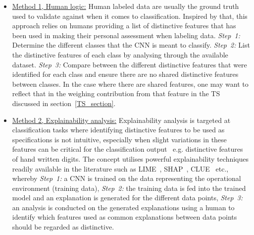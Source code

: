\begin{itemize}
    \item 
    \underline{Method 1, Human logic:} 
    Human labeled data are usually the ground truth used to validate against when it comes to classification. Inspired by that, this approach relies on humans providing a list of distinctive features that has been used in making their personal assessment when labeling data. 
    \textit{Step~1:} Determine the different classes that the CNN is meant to classify. 
    \textit{Step~2:} List the distinctive features of each class by analysing through the available dataset. 
    \textit{Step~3:} Compare between the different distinctive features that were identified for each class and ensure there are no shared distinctive features between classes. In the case where there are shared features, one may want to reflect that in the weighing contribution from that feature in the TS discussed in section~\ref{TS_section}.
    
    \item \underline{Method 2, Explainability analysis:} Explainability analysis is targeted at classification tasks where identifying distinctive features to be used as specifications is not intuitive, especially when slight variations in these features can be critical for the classification output~\cite{Antoran2020} e.g. distinctive features of hand written digits.
    The concept utilises powerful explainability techniques readily available in the literature such as LIME~\cite{Ribeiro2016}, SHAP~\cite{Lundberg2017}, CLUE~\cite{Antoran2020} etc., whereby 
    \textit{Step~1:} a CNN is trained on the data representing the operational environment (training data), 
    \textit{Step~2:} the training data is fed into the trained model and an explanation is generated for the different data points, 
    \textit{Step~3:} an analysis is conducted on the generated explanations using a human to identify which features used as common explanations between data points should be regarded as distinctive.
\end{itemize}

